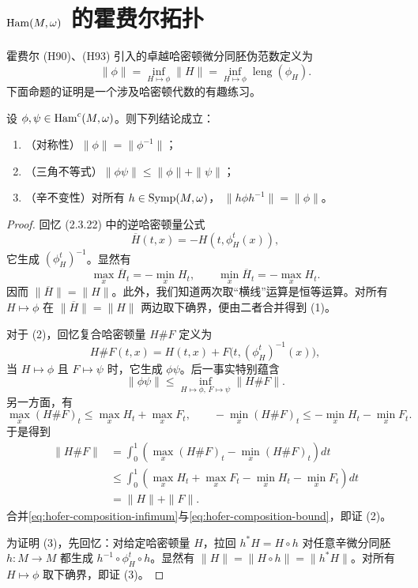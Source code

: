 \section{\texorpdfstring{$\operatorname{Ham}(M,\omega)$}{Ham(M, omega)} 的霍费尔拓扑}
\label{sec:hofer-topology-ham}

霍费尔 (H90)、(H93) 引入的卓越哈密顿微分同胚伪范数定义为
\begin{equation}
 \|\phi\|=\inf_{H\mapsto\phi}\|H\|
 =\inf_{H\mapsto\phi}\operatorname{leng}(\phi_H).
 \label{eq:hofer-pseudonorm}
\end{equation}
下面命题的证明是一个涉及哈密顿代数的有趣练习。

\begin{proposition}\label{prop:hofer-pseudonorm-properties}
设 $\phi,\psi\in\operatorname{Ham}^c(M,\omega)$。则下列结论成立：
\begin{enumerate}[label=(\arabic*)]
 \item （对称性）$\|\phi\|=\|\phi^{-1}\|$；
 \item （三角不等式）$\|\phi\psi\|\leq\|\phi\|+\|\psi\|$；
 \item （辛不变性）对所有 $h\in\operatorname{Symp}(M,\omega)$，
 $\|h\phi h^{-1}\|=\|\phi\|$。
\end{enumerate}
\end{proposition}

\begin{proof}
回忆 (2.3.22) 中的逆哈密顿量公式
\[
 \overline H(t,x)=-H(t,\phi_H^t(x)),
\]
它生成 $(\phi_H^t)^{-1}$。显然有
\[
 \max_x\overline H_t=-\min_xH_t,
 \qquad
 \min_x\overline H_t=-\max_xH_t.
\]
因而 $\|\overline H\|=\|H\|$。此外，我们知道两次取“横线”运算是恒等运算。对所有 $H\mapsto\phi$ 在
$\|\overline H\|=\|H\|$ 两边取下确界，便由二者合并得到 (1)。

对于 (2)，回忆复合哈密顿量 $H\#F$ 定义为
\[
 H\#F(t,x)=H(t,x)+F\bigl(t,(\phi_H^t)^{-1}(x)\bigr),
\]
当 $H\mapsto\phi$ 且 $F\mapsto\psi$ 时，它生成 $\phi\psi$。后一事实特别蕴含
\begin{equation}
 \|\phi\psi\|\leq
 \inf_{H\mapsto\phi,\,F\mapsto\psi}\|H\#F\|.
 \label{eq:hofer-composition-infimum}
\end{equation}
另一方面，有
\[
 \max_x(H\#F)_t\leq\max_xH_t+\max_xF_t,
 \qquad
 -\min_x(H\#F)_t\leq-\min_xH_t-\min_xF_t.
\]
于是得到
\begin{equation}
\begin{aligned}
 \|H\#F\|
 &=\int_0^1\left(\max_x(H\#F)_t-\min_x(H\#F)_t\right)dt\\
 &\leq\int_0^1\left(
   \max_xH_t+\max_xF_t-\min_xH_t-\min_xF_t\right)dt\\
 &=\|H\|+\|F\|.
\end{aligned}
\label{eq:hofer-composition-bound}
\end{equation}
合并\eqref{eq:hofer-composition-infimum}与\eqref{eq:hofer-composition-bound}，即证 (2)。

为证明 (3)，先回忆：对给定哈密顿量 $H$，拉回
$h^*H=H\circ h$ 对任意辛微分同胚 $h:M\to M$ 都生成
$h^{-1}\circ\phi_H^t\circ h$。显然有
$\|H\|=\|H\circ h\|=\|h^*H\|$。对所有 $H\mapsto\phi$ 取下确界，即证 (3)。
\end{proof}

